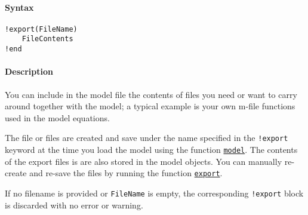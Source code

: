 


	\paragraph{Syntax}

\begin{verbatim}
!export(FileName)
    FileContents
!end
\end{verbatim}

\paragraph{Description}

You can include in the model file the contents of files you need or want
to carry around together with the model; a typical example is your own
m-file functions used in the model equations.

The file or files are created and save under the name specified in the
\texttt{!export} keyword at the time you load the model using the
function \href{model/model}{\texttt{model}}. The contents of the export
files is are also stored in the model objects. You can manually
re-create and re-save the files by running the function
\href{model/export}{\texttt{export}}.

If no filename is provided or \texttt{FileName} is empty, the
corresponding \texttt{!export} block is discarded with no error or
warning.


